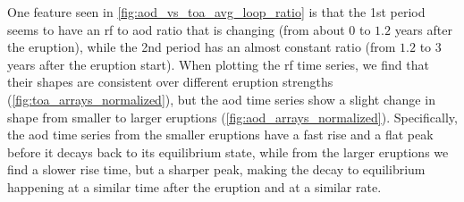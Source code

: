 \documentclass{ametsocV5}
\begin{document}




One feature seen in \cref{fig:aod_vs_toa_avg_loop_ratio} is that the 1st period seems to
have an \ac{rf} to \ac{aod} ratio that is changing (from about \(0\) to \(1.2\) years
after the eruption), while the 2nd period has an almost constant ratio (from \(1.2\) to
\(3\) years after the eruption start). When plotting the \ac{rf} time series, we find
that their shapes are consistent over different eruption strengths
(\cref{fig:toa_arrays_normalized}), but the \ac{aod} time series show a slight change in
shape from smaller to larger eruptions (\cref{fig:aod_arrays_normalized}). Specifically,
the \ac{aod} time series from the smaller eruptions have a fast rise and a flat peak
before it decays back to its equilibrium state, while from the larger eruptions we find
a slower rise time, but a sharper peak, making the decay to equilibrium happening at a
similar time after the eruption and at a similar rate.
\end{document}
